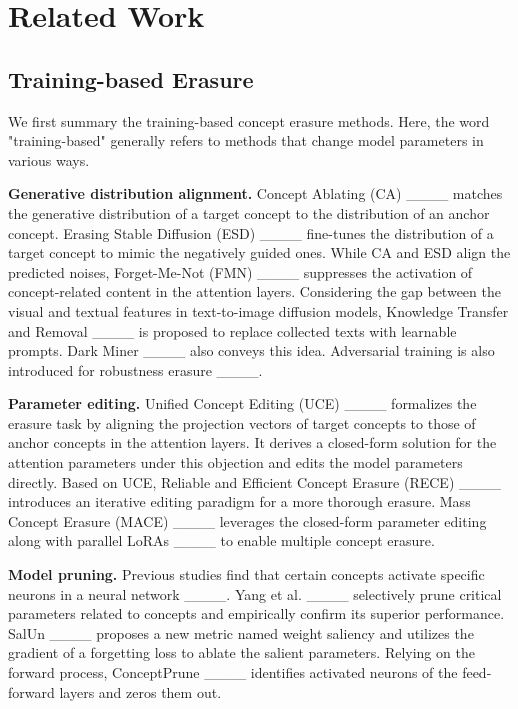 \section{Related Work}
\label{sec: related work}

\subsection{Training-based Erasure}

We first summary the training-based concept erasure methods. Here, the word "training-based" generally refers to methods that change model parameters in various ways.

\textbf{Generative distribution alignment.} Concept Ablating (CA) ____ matches the generative distribution of a target concept to the distribution of an anchor concept. Erasing Stable Diffusion (ESD) ____ fine-tunes the distribution of a target concept to mimic the negatively guided ones. While CA and ESD align the predicted noises, Forget-Me-Not (FMN) ____ suppresses the activation of concept-related content in the attention layers. Considering the gap between the visual and textual features in text-to-image diffusion models, Knowledge Transfer and Removal ____ is proposed to replace collected texts with learnable prompts. Dark Miner ____ also conveys this idea. Adversarial training is also introduced for robustness erasure ____.


\textbf{Parameter editing.} Unified Concept Editing (UCE) ____ formalizes the erasure task by aligning the projection vectors of target concepts to those of anchor concepts in the attention layers. It derives a closed-form solution for the attention parameters under this objection and edits the model parameters directly. Based on UCE, Reliable and Efficient Concept Erasure (RECE) ____ introduces an iterative editing paradigm for a more thorough erasure. Mass Concept Erasure  (MACE) ____ leverages the closed-form parameter editing along with parallel LoRAs ____ to enable multiple concept erasure.


\textbf{Model pruning.} Previous studies find that certain concepts activate specific neurons in a neural network ____. Yang et al. ____ selectively prune critical parameters related to concepts and empirically confirm
its superior performance. SalUn ____ proposes a new metric named weight saliency and utilizes the gradient of a forgetting loss to ablate the salient parameters. Relying on the forward process, ConceptPrune ____ identifies activated neurons of the feed-forward layers and zeros them out.


